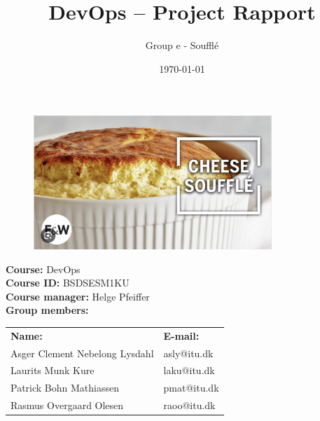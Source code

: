 \title{\textbf{DevOps – Project Rapport}}
\author{Group e - Soufflé}

\date{\today}

\maketitle

\begin{figure}[H]
    \centering
    \includegraphics[width = 9.0cm]{Images/cheeseSouffle.png}
\end{figure}

\begin{center}
    \vspace{1cm}
    \textbf{Course:} DevOps \\
    \textbf{Course ID:} BSDSESM1KU \\
    \textbf{Course manager:} Helge Pfeiffer\\
    \vspace{1cm}
    \textbf{Group members: }
\end{center}

\begin{center}
\begin{tabular}{ m{20em}  m{10em} }
    \textbf{Name:} & \textbf{E-mail:}  \\
    Asger Clement Nebelong Lysdahl & asly@itu.dk \\
    Laurits Munk Kure & laku@itu.dk \\
    Patrick Bohn Mathiassen & pmat@itu.dk \\
    Rasmus Overgaard Olesen & raoo@itu.dk \\
\end{tabular}

\end{center}